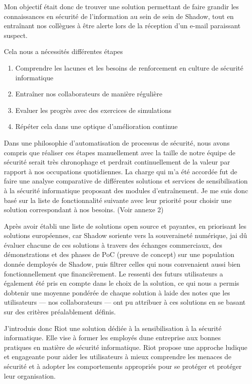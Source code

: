 \documentclass[
  11pt,
  a4paper,
  krantz2,
  11pt,
  oneside]{krantz}
\begin{document}
Mon objectif était donc de trouver une solution permettant de faire grandir les connaissances en sécurité de l'information au sein de sein de Shadow, tout en entraînant nos collègues à être alerte lors de la réception d'un e-mail paraissant suspect.

Cela nous a nécessités différentes étapes

\begin{enumerate}
\def\labelenumi{\roman{enumi}.}
\item
  Comprendre les lacunes et les besoins de renforcement en culture de sécurité informatique
\item
  Entraîner nos collaborateurs de manière régulière
\item
  Evaluer les progrès avec des exercices de simulations
\item
  Répéter cela dans une optique d'amélioration continue
\end{enumerate}

Dans une philosophie d'automatisation de processus de sécurité, nous avons compris que réaliser ces étapes manuellement avec la taille de notre équipe de sécurité serait très chronophage et perdrait continuellement de la valeur par rapport à nos occupations quotidiennes. La charge qui m'a été accordée fut de faire une analyse comparative de différentes solutions et services de sensibilisation à la sécurité informatique proposant des modules d'entraînement. Je me suis donc basé sur la liste de fonctionnalité suivante avec leur priorité pour choisir une solution correspondant à nos besoins. (Voir annexe 2)

Après avoir établi une liste de solutions open source et payantes, en priorisant les solutions européennes, car Shadow s\textquotesingle oriente vers la souveraineté numérique, j\textquotesingle ai dû évaluer chacune de ces solutions à travers des échanges commerciaux, des démonstrations et des phases de PoC (preuve de concept) sur une population donnée d\textquotesingle employés de Shadow, puis filtrer celles qui nous convenaient aussi bien fonctionnellement que financièrement. Le ressenti des futurs utilisateurs a également été pris en compte dans le choix de la solution, ce qui nous a permis d\textquotesingle obtenir une moyenne pondérée de chaque solution à l\textquotesingle aide des notes que les utilisateurs --- nos collaborateurs --- ont pu attribuer à ces solutions en se basant sur des critères préalablement définis.

J'introduis donc Riot une solution dédiée à la sensibilisation à la sécurité informatique. Elle vise à former les employés d\textquotesingle une entreprise aux bonnes pratiques en matière de sécurité informatique. Riot propose une approche ludique et engageante pour aider les utilisateurs à mieux comprendre les menaces de sécurité et à adopter les comportements appropriés pour se protéger et protéger leur organisation.
\end{document}
